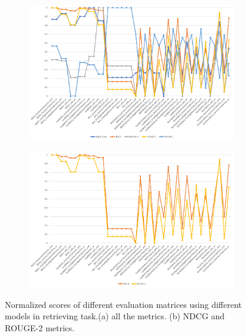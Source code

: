 \begin{figure}[htbp]
	\centering
	\begin{subfigure}[b]{1\textwidth}
		\centering
		\includegraphics[width=\textwidth]{figure/partB_normalized_evaluation_metrics.png}
		\caption{}
		\label{fig: partbnormalizedevaluationmetrics_all}
	\end{subfigure}
	\hfill
	\begin{subfigure}[b]{1\textwidth}
		\centering
		\includegraphics[width=\textwidth]{figure/partB_normalized_evaluation_metrics_part.png}
		\caption{}
		\label{fig: partbnormalizedevaluationmetrics_part}
	\end{subfigure}
	\hfill
	\caption[]{Normalized scores of different evaluation matrices using different models in retrieving task.(a) all the metrics. (b) NDCG and ROUGE-2 metrics.}
	\label{fig: partB_normalized_evaluation_metrics}
\end{figure}


